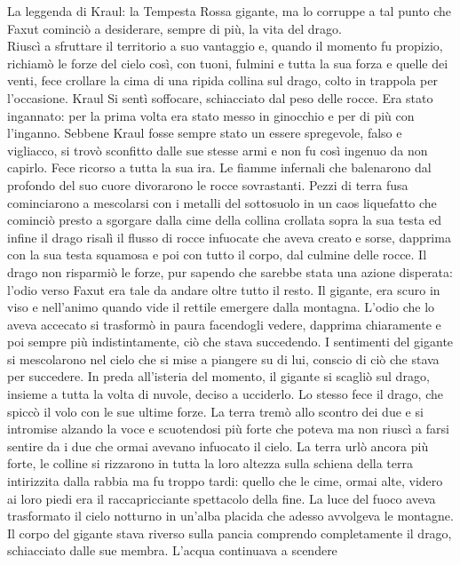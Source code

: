 \begin{commentbox}{La leggenda di Kraul: la Tempesta Rossa}
  gigante, ma lo corruppe a tal punto che Faxut cominci\`o a desiderare,
  sempre di pi\`u, la vita del drago.\\
  Riusc\`i a sfruttare il territorio a suo vantaggio e, quando il momento fu propizio,
  richiam\`o le forze del cielo cos\`i, con tuoni, fulmini e tutta la sua forza e quelle dei venti,
  fece crollare la cima di una ripida collina sul drago, colto in trappola per l'occasione.
  Kraul Si sent\`i soffocare, schiacciato dal peso delle rocce. Era stato ingannato:
  per la prima volta era stato messo in ginocchio e per di pi\`u con l'inganno.
  Sebbene Kraul fosse sempre stato un essere spregevole, falso e vigliacco,
  si trov\`o sconfitto dalle sue stesse armi e non fu cos\`i ingenuo da non capirlo.
  Fece ricorso a tutta la sua ira.
  Le fiamme infernali che balenarono dal profondo del suo cuore divorarono le
  rocce sovrastanti. Pezzi di terra fusa cominciarono a mescolarsi con i metalli del
  sottosuolo in un caos liquefatto che cominci\`o presto a sgorgare dalla cime della collina
  crollata sopra la sua testa ed infine  il drago risal\`i il flusso di rocce infuocate
  che aveva creato e sorse, dapprima con la sua testa squamosa e poi con tutto il corpo,
  dal culmine delle rocce. Il drago non risparmi\`o le forze, pur sapendo
  che sarebbe stata una azione disperata: l'odio verso Faxut era tale da andare oltre
  tutto il resto. Il gigante, era scuro in viso e nell'animo quando vide il rettile
  emergere dalla montagna. L'odio che lo aveva accecato si trasform\`o in paura facendogli
  vedere, dapprima chiaramente e poi sempre pi\`u indistintamente, ci\`o che stava succedendo.
  I sentimenti del gigante si mescolarono nel cielo che si mise a piangere su di lui,
  conscio di ci\`o che stava per succedere. In preda all'isteria del momento, il gigante
  si scagli\`o sul drago, insieme a tutta la volta di nuvole, deciso a ucciderlo. Lo stesso
  fece il drago, che spicc\`o il volo con le sue ultime forze. La terra trem\`o allo scontro
  dei due e si intromise alzando la voce e scuotendosi pi\`u forte che poteva ma
  non riusc\`i a farsi sentire da i due che ormai avevano infuocato il cielo.
  La terra url\`o ancora pi\`u forte, le colline si rizzarono in tutta la loro altezza sulla
  schiena della terra intirizzita dalla rabbia  ma fu troppo tardi:
  quello che le cime, ormai alte, videro ai loro piedi era il
  raccapricciante spettacolo della fine. La luce del fuoco aveva trasformato il cielo notturno
  in un'alba placida che adesso avvolgeva le montagne. Il corpo del gigante stava riverso sulla pancia
  comprendo completamente il drago, schiacciato dalle sue membra. L'acqua continuava a scendere

\end{commentbox}
